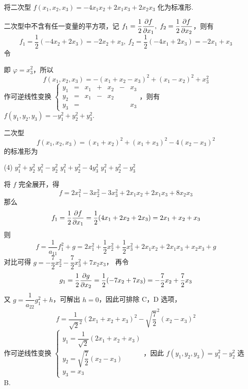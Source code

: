 \begin{example}
    将二次型 $f(x_1,x_2,x_3)=-4x_1x_2+2x_1x_3+2x_2x_3$ 化为标准形.
\end{example}
\begin{solution}
    二次型中不含有任一变量的平方项，记 $f_1=\dfrac{1}{2}\displaystyle\pdv{f}{x_1},~f_2=\dfrac{1}{2}\displaystyle\pdv{f}{x_2}$，则有
    $$f_1=\dfrac{1}{2}(-4x_2+2x_3)=-2x_2+x_3,~f_2=\dfrac{1}{2}(-4x_1+2x_3)=-2x_1+x_3$$
    令
    即 $\varphi=x_3^2$，所以
    $$f(x_1,x_2,x_3)=-(x_1+x_2-x_3)^2+(x_1-x_2)^2+x_3^2$$
    作可逆线性变换 $\left\{\begin{matrix}
            y_1 & = & x_1 & + & x_2 & - & x_3 \\
            y_2 & = & x_1 & - & x_2 &         \\
            y_3 & = &     &   &     &   & x_3
        \end{matrix}\right.$，则有 $f(y_1,y_2,y_3)=-y_1^2+y_2^2+y_3^2.$
\end{solution}

\begin{example}
    二次型 $$f(x_1,x_2,x_3)=(x_1+x_2)^2+(x_1+x_3)^2-4(x_2-x_3)^2$$ 的标准形为
    \begin{tasks}(4)
        \task $y_1^2+y_2^2$
        \task $y_1^2-y_2^2$
        \task $y_1^2+y_2^2-4y_3^2$
        \task $y_1^2+y_2^2-y_3^2$
    \end{tasks}
\end{example}
\begin{solution}
    将 $f$ 完全展开，得 $$f=2x_1^2-3x_2^2-3x_3^2+2x_1x_2+2x_1x_3+8x_2x_3$$
    那么 $$f_1=\dfrac{1}{2}\pdv{f}{x_1}=\dfrac{1}{2}(4x_1+2x_2+2x_3)=2x_1+x_2+x_3$$
    则 $$f=\dfrac{1}{a_{11}}f_1^2+g=2x_1^2+\dfrac{1}{2}x_2^2+\dfrac{1}{2}x_3^2+2x_1x_2+2x_1x_3+x_2x_3+g$$
    对比可得 $g=-\dfrac{7}{2}x_2^2-\dfrac{7}{2}x_3^2+7x_2x_3$，
    再令 $$g_1=\dfrac{1}{2}\pdv{g}{x_2}=\dfrac{1}{2}(-7x_2+7x_3)=-\dfrac{7}{2}x_2+\dfrac{7}{2}x_3$$
    又 $g=\dfrac{1}{a_{22}}g_1^2+h$，可解出 $h=0$，因此可排除 C，D 选项，
    $$f=\dfrac{1}{\sqrt{2}^2}(2x_1+x_2+x_3)^2-\sqrt{\dfrac{7}{2}}^2(x_2-x_3)^2$$
    作可逆线性变换 $\begin{cases}
            y_1=\dfrac{1}{\sqrt{2}} (2x_1+x_2+x_3) \\[6pt]
            y_2=\sqrt{\dfrac{7}{2} } (x_2-x_3)     \\[6pt]
            y_3=x_3
        \end{cases}$，因此 $f(y_1,y_2,y_3)=y_1^2-y_2^2$ 选 B.
\end{solution}

